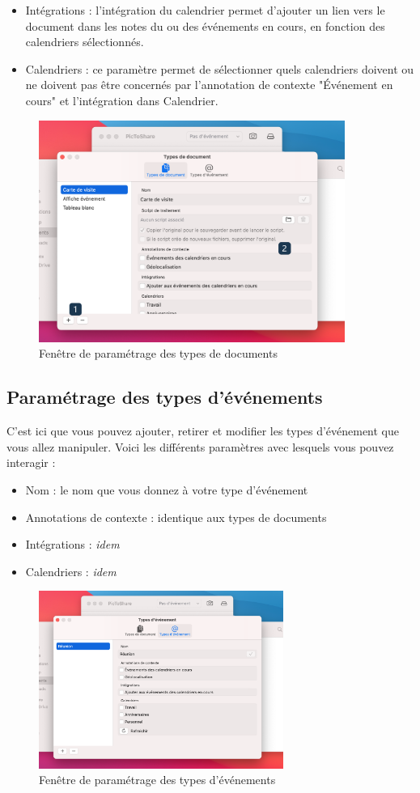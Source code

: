 \documentclass[a4paper,11pt]{article}
\begin{document}
\begin{itemize}
		\item Intégrations : l'intégration du calendrier permet d'ajouter un lien vers le document dans les notes du ou des événements en cours, en fonction des calendriers sélectionnés.

		\item Calendriers : ce paramètre permet de sélectionner quels calendriers doivent ou ne doivent pas être concernés par l'annotation de contexte "Événement en cours" et l'intégration dans Calendrier.
	\end{itemize}

	\newpage

	\begin{figure}[h!]
		\centering
		\includegraphics[width=10cm]{Type_de_doc}
		\caption{Fenêtre de paramétrage des types de documents}
	\end{figure}

	\subsection{Paramétrage des types d'événements}
	C'est ici que vous pouvez ajouter, retirer et modifier les types d'événement que vous allez manipuler.
	Voici les différents paramètres avec lesquels vous pouvez interagir :
	\begin{itemize}
		\item Nom : le nom que vous donnez à votre type d'événement
		\item Annotations de contexte : identique aux types de documents
		\item Intégrations : \textit{idem}
		\item Calendriers : \textit{idem}
	\end{itemize}

	\begin{figure}[h!]
		\centering
		\includegraphics[width=8cm]{Type_d_event}
		\caption{Fenêtre de paramétrage des types d'événements}
	\end{figure}
\end{document}
